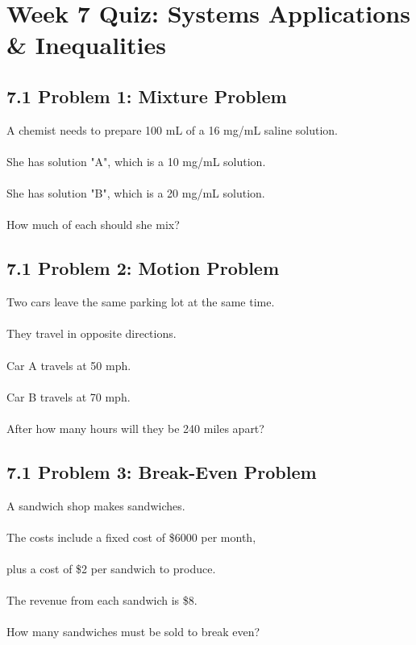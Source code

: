\documentclass[12pt]{article}
\begin{document}
            \newpage

    \section*{Week 7 Quiz: Systems Applications \& Inequalities}
	
        \subsection*{7.1 Problem 1: Mixture Problem}
            
            A chemist needs to prepare 100 mL of a 16 mg/mL saline solution.\\\\
            She has solution "A", which is a 10 mg/mL solution.\\\\
            She has solution "B", which is a 20 mg/mL solution.\\\\
            How much of each should she mix?

            \vspace{1cm}
        
        \subsection*{7.1 Problem 2: Motion Problem}

            Two cars leave the same parking lot at the same time.\\\\
            They travel in opposite directions.\\\\
            Car A travels at 50 mph.\\\\
            Car B travels at 70 mph.\\\\
            After how many hours will they be 240 miles apart?
        
            \vspace{1cm}
        
        \subsection*{7.1 Problem 3: Break-Even Problem}
        
            A sandwich shop makes sandwiches.\\\\	
            The costs include a fixed cost of \$6000 per month,\\\\
            plus a cost of \$2 per sandwich to produce.\\\\
            The revenue from each sandwich is \$8.\\\\
            How many sandwiches must be sold to break even?
\end{document}
